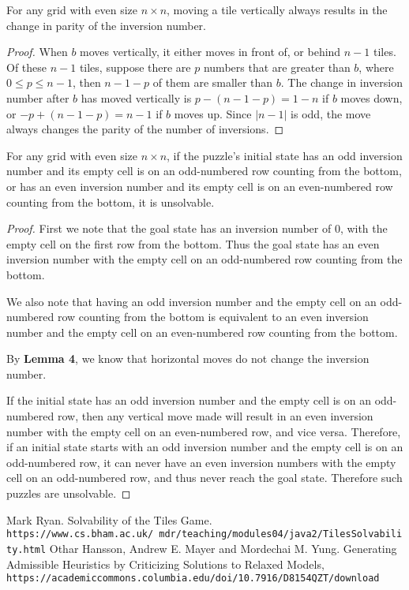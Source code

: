 \documentclass{llncs}
\begin{document}
\begin{lemma}
For any grid with even size $n \times n$, moving a tile vertically always results in the change in parity of the inversion number.
\end{lemma}

\begin{proof}
When $b$ moves vertically, it either moves in front of, or behind $n-1$ tiles. Of these $n-1$ tiles, suppose there are $p$ numbers that are greater than $b$, where $0 \leq p \leq n-1$, then $n-1-p$ of them are smaller than $b$. The change in inversion number after $b$ has moved vertically is $p-(n-1-p) = 1-n$ if $b$ moves down, or $-p + (n-1-p) = n-1$ if $b$ moves up. Since $|n-1|$ is odd, the move always changes the parity of the number of inversions.
\end{proof}

\begin{lemma}
For any grid with even size $n \times n$, if the puzzle's initial state has an odd inversion number and its empty cell is on an odd-numbered row counting from the bottom, or has an even inversion number and its empty cell is on an even-numbered row counting from the bottom, it is unsolvable.
\end{lemma}

\begin{proof}
First we note that the goal state has an inversion number of $0$, with the empty cell on the first row from the bottom. Thus the goal state has an even inversion number with the empty cell on an odd-numbered row counting from the bottom.

We also note that having an odd inversion number and the empty cell on an odd-numbered row counting from the bottom is equivalent to an even inversion number and the empty cell on an even-numbered row counting from the bottom.

By \textbf{Lemma 4}, we know that horizontal moves do not change the inversion number.

If the initial state has an odd inversion number and the empty cell is on an odd-numbered row, then any vertical move made will result in an even inversion number with the empty cell on an even-numbered row, and vice versa. Therefore, if an initial state starts with an odd inversion number and the empty cell is on an odd-numbered row, it can never have an even inversion numbers with the empty cell on an odd-numbered row, and thus never reach the goal state. Therefore such puzzles are unsolvable.
\end{proof}


\begin{thebibliography}{9}
Mark Ryan. 
Solvability of the Tiles Game.
\\\texttt{https://www.cs.bham.ac.uk/~mdr/teaching/modules04/java2/TilesSolvability.html}
Othar Hansson, Andrew E. Mayer and Mordechai M. Yung. 
Generating Admissible Heuristics by
Criticizing Solutions to Relaxed Models,
\\\texttt{https://academiccommons.columbia.edu/doi/10.7916/D8154QZT/download}

\end{thebibliography}
\end{document}
